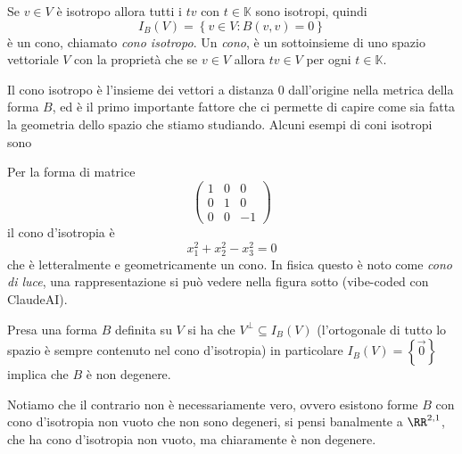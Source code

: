 \documentclass[11pt]{scrartcl}
\newcommand{\KK}{\mathbb{K}}
\begin{document}
	\begin{definition}
		Se $v\in V$ è isotropo allora tutti i $tv$ con $t\in \KK$ sono isotropi, quindi 
		$$I_B(V)=\left\{v\in V:B(v,v)=0\right\}$$
		è un cono, chiamato \textit{cono isotropo}. Un \textit{cono}, è un sottoinsieme di uno spazio vettoriale $V$ con la proprietà che se $v\in V$ allora $tv\in V$ per ogni $t\in \KK$.
	\end{definition}
	Il cono isotropo è l'insieme dei vettori a distanza $0$ dall'origine nella metrica della forma $B$, ed è il primo importante fattore che ci permette di capire come sia fatta la geometria dello spazio che stiamo studiando.
	Alcuni esempi di coni isotropi sono
	\begin{example}
		Per la forma di matrice
		$$
		\begin{pmatrix}
			1 & 0 & 0 \\
			0 & 1 & 0 \\
			0 & 0 & -1
		\end{pmatrix}
		$$
		il cono d'isotropia è
		$$x_1^2+x_2^2-x_3^2=0$$
		che è letteralmente e geometricamente un cono. In fisica questo è noto come \textit{cono di luce}, una rappresentazione si può vedere nella figura sotto (vibe-coded con ClaudeAI).
	\end{example}
	\begin{remark}
		Presa una forma $B$ definita su $V$ si ha che $V^\perp\subseteq I_B(V)$ (l'ortogonale di tutto lo spazio è sempre contenuto nel cono d'isotropia) in particolare $I_B(V)=\left\{\vec{0}\right\}$ implica che $B$ è non degenere.
	\end{remark}
	Notiamo che il contrario non è necessariamente vero, ovvero esistono forme $B$ con cono d'isotropia non vuoto che non sono degeneri, si pensi banalmente a $\RR^{2,1}$, che ha cono d'isotropia non vuoto, ma chiaramente è non degenere.
	
\end{document}
